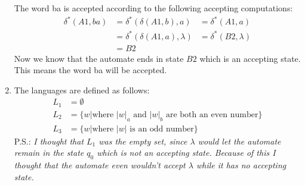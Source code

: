 \documentclass{article}
\begin{document}
\begin{enumerate}[label=\alph*)]
The word ba is accepted according to the following accepting computations: \\
\begin{align*}
\delta^*(A1, ba) &= \delta^*(\delta (A1, b), a)       &= \delta^*(A1, a) \\
                      &= \delta^*(\delta (A1, a), \lambda) &= \delta^*(B2, \lambda) \\
                      &= B2
\end{align*}
Now we know that the automate ends in state $B2$ which is an accepting state. This means the word ba will be accepted.

\item The languages are defined as follows:
\begin{align*}
  L_1 &= \emptyset \\
  L_2 &= \{w | \text{where $|w|_a$ and $|w|_b$ are both an even number} \} \\
  L_3 &= \{w | \text{where $|w|$ is an odd number} \}
\end{align*}
P.S.: \emph{I thought that $L_1$ was the empty set, since $\lambda$ would let the automate remain in the state $q_0$ which is not an accepting state. Because of this I thought that the automate even wouldn't accept $\lambda$ while it has no accepting state.}

\end{enumerate}
\end{document}
